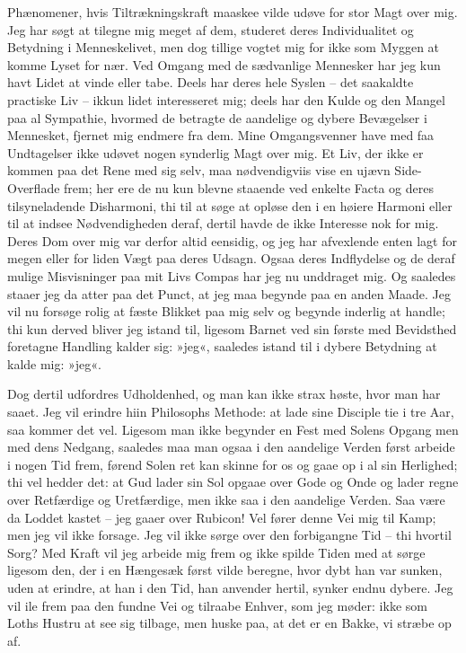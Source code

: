 \documentclass[12pt,a4paper]{article}
\begin{document}
Phænomener, hvis Tiltrækningskraft maaskee vilde udøve for stor Magt over mig. Jeg har søgt at tilegne mig meget af dem, studeret deres Individualitet og Betydning i Menneskelivet, men dog tillige vogtet mig for ikke som Myggen at komme Lyset for nær. Ved Omgang med de sædvanlige Mennesker har jeg kun havt Lidet at vinde eller tabe. Deels har deres hele Syslen – det saakaldte practiske Liv – ikkun lidet interesseret mig; deels har den Kulde og den Mangel paa al Sympathie, hvormed de betragte de aandelige og dybere Bevægelser i Mennesket, fjernet mig endmere fra dem. Mine Omgangsvenner have med faa Undtagelser ikke udøvet nogen synderlig Magt over mig. Et Liv, der ikke er kommen paa det Rene med sig selv, maa nødvendigviis vise en ujævn Side-Overflade frem; her ere de nu kun blevne staaende ved enkelte Facta og deres tilsyneladende Disharmoni, thi til at søge at opløse den i en høiere Harmoni eller til at indsee Nødvendigheden deraf, dertil havde de ikke Interesse nok for mig. Deres Dom over mig var derfor altid eensidig, og jeg har afvexlende enten lagt for megen eller for liden Vægt paa deres Udsagn. Ogsaa deres Indflydelse og de deraf mulige Misvisninger paa mit Livs Compas har jeg nu unddraget mig. Og saaledes staaer jeg da atter paa det Punct, at jeg maa begynde paa en anden Maade. Jeg vil nu forsøge rolig at fæste Blikket paa mig selv og begynde inderlig at handle; thi kun derved bliver jeg istand til, ligesom Barnet ved sin første med Bevidsthed foretagne Handling kalder sig: »jeg«, saaledes istand til i dybere Betydning at kalde mig: »jeg«.

Dog dertil udfordres Udholdenhed, og man kan ikke strax høste, hvor man har saaet. Jeg vil erindre hiin Philosophs Methode: at lade sine Disciple tie i tre Aar, saa kommer det vel. Ligesom man ikke begynder en Fest med Solens Opgang men med dens Nedgang, saaledes maa man ogsaa i den aandelige Verden først arbeide i nogen Tid frem, førend Solen ret kan skinne for os og gaae op i al sin Herlighed; thi vel hedder det: at Gud lader sin Sol opgaae over Gode og Onde og lader regne over Retfærdige og Uretfærdige, men ikke saa i den aandelige Verden. Saa være da Loddet kastet – jeg gaaer over Rubicon! Vel fører denne Vei mig til Kamp; men jeg vil ikke forsage. Jeg vil ikke sørge over den forbigangne Tid – thi hvortil Sorg? Med Kraft vil jeg arbeide mig frem og ikke spilde Tiden med at sørge ligesom den, der i en Hængesæk først vilde beregne, hvor dybt han var sunken, uden at erindre, at han i den Tid, han anvender hertil, synker endnu dybere. Jeg vil ile frem paa den fundne Vei og tilraabe Enhver, som jeg møder: ikke som Loths Hustru at see sig tilbage, men huske paa, at det er en Bakke, vi stræbe op af.
\end{document}
